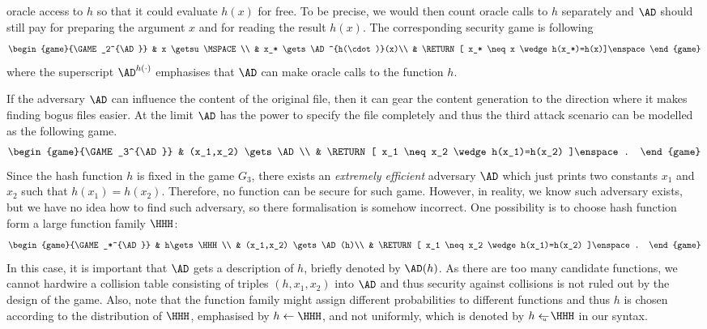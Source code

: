 \documentclass{crypto-exercise}
\begin{document}
\begin{solution}
  oracle access to $h$ so that it could evaluate $h(x)$ for free. To
  be precise, we would then count oracle calls to $h$ separately and
  $\AD$ should still pay for preparing the argument $x$ and for
  reading the result $h(x)$. The corresponding security game is
  following
  \begin{align*}
    \begin{game}{\GAME_2^{\AD}}
      & x \getsu \MSPACE\\
      & x_* \gets  \AD^{h(\cdot)}(x)\\
      & \RETURN [ x_* \neq x \wedge h(x_*)=h(x)]\enspace
    \end{game}
  \end{align*}
  where the superscript $\AD^{h(\cdot)}$ emphasises that $\AD$ can
  make oracle calls to the function $h$.

  If the adversary $\AD$ can influence the content of the original
  file, then it can gear the content generation to the direction where
  it makes finding bogus files easier. At the limit $\AD$ has the
  power to specify the file completely and thus the third attack
  scenario can be modelled as the following game.
  \begin{align*}
    \begin{game}{\GAME_3^{\AD}}
      & (x_1,x_2) \gets  \AD\\
      & \RETURN [ x_1 \neq x_2 \wedge h(x_1)=h(x_2) ]\enspace.
    \end{game}
  \end{align*}
  Since the hash function $h$ is fixed in the game $G_3$, there exists
  an \emph{extremely efficient} adversary $\AD$ which just prints two
  constants $x_1$ and $x_2$ such that $h(x_1)=h(x_2)$. Therefore, no
  function can be secure for such game. However, in reality, we know
  such adversary exists, but we have no idea how to find such
  adversary, so there formalisation is somehow incorrect. One
  possibility is to choose hash function form a large function family
  $\HHH$:
  \begin{align*}
    \begin{game}{\GAME_*^{\AD}}
      & h\gets\HHH\\
      & (x_1,x_2) \gets  \AD(h)\\
      & \RETURN [ x_1 \neq x_2 \wedge h(x_1)=h(x_2) ]\enspace.
    \end{game}
  \end{align*}
  In this case, it is important that $\AD$ gets a description of $h$,
  briefly denoted by $\AD(h)$. As there are too many candidate
  functions, we cannot hardwire a collision table consisting of
  triples $(h, x_1, x_2)$ into $\AD$ and thus security against
  collisions is not ruled out by the design of the game. Also, note
  that the function family might assign different probabilities to
  different functions and thus $h$ is chosen according to the
  distribution of $\HHH$, emphasised by $h\gets \HHH$, and not
  uniformly, which is denoted by $h\getsu \HHH$ in our syntax.

\end{solution}
\end{document}
